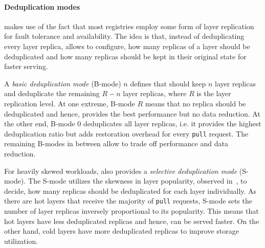 \paragraph{Deduplication modes}

\sysname makes use of the fact that most registries employ some form of layer replication
for fault tolerance and availability. The idea is that, instead of deduplicating every layer replica,
\sysname allows to configure, how many replicas of a layer should be deduplicated and
how many replicas should be kept in their original state for faster serving.

A \emph{basic deduplication mode} (B-mode) $n$ defines that \sysname should keep $n$ layer
replicas and deduplicate the remaining $R-n$ layer replicas, where $R$ is the
layer replication level.
%
%
At one extreme, B-mode $R$ means that no replica should be deduplicated and hence, provides the best
performance but no data reduction. At the other end, B-mode $0$ deduplicates all layer replicas, i.e. it
provides the highest deduplication ratio but adds restoration overhead for every \texttt{pull} request.
The remaining B-modes in between allow to trade off performance and data reduction.

For heavily skewed workloads, \sysname also provides a \emph{selective deduplication mode} (S-mode). The
S-mode utilizes the skewness in layer popularity, observed in~\cite{dockerworkload}, to decide, how many
replicas should be deduplicated for each layer individually. As there are hot layers that receive the
majority of \texttt{pull} requests, S-mode sets the number of layer replicas inversely proportional to
its popularity. This means that hot layers have less deduplicated replicas and hence, can be served
faster. On the other hand, cold layers have more deduplicated replicas to improve storage utilization.
%


